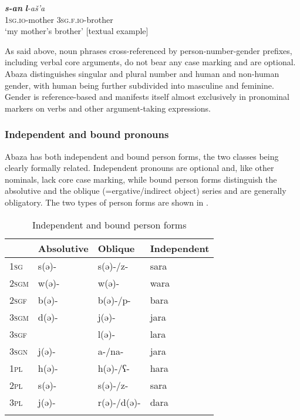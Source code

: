 \documentclass[output=paper]{langscibook}
\begin{document}
\ea 
\label{ex:Arkadiev:6}
    \gll \textbf{\textit{s-an}}  \textbf{\textit{l}}\textit{{}-aš’a}\\
    \textsc{1sg.io}{}-mother  \textsc{3sg.f.io}{}-brother\\
    \glt ‘my mother’s brother’ [textual example]
\z





As said above, noun phrases cross-referenced by person-number-gender prefixes, including verbal core arguments, do not bear any case marking and are optional. Abaza distinguishes singular and plural number and human and non-human gender, with human being further subdivided into masculine and feminine. Gender is reference-based and manifests itself almost exclusively in pronominal markers on verbs and other argument-taking expressions.



\subsubsection{Independent and bound pronouns}\label{sec:Arkadiev:1.2.3}



Abaza has both independent and bound person forms, the two classes being clearly formally related. Independent pronouns are optional and, like other nominals, lack core case marking, while bound person forms distinguish the absolutive and the oblique (=ergative/indirect object) series and are generally obligatory. The two types of person forms are shown in .



\begin{table}
\caption{Independent and bound person forms}
\label{tab:Arkadiev:2}
\begin{tabularx}{0.7\textwidth}{XXXX} 
\lsptoprule
& Absolutive & Oblique & Independent\\
\hline
1\textsc{sg} & {s({ə}){}-} & {s({ə}){}-/z-} & {sara}\\
2\textsc{sgm} & {w({ə})-} & {w({ə})-} & {wara}\\
2\textsc{sgf} & {b({ə})-} & {b({ə})-/p{}-} & {bara}\\
3\textsc{sgm} & {d({ə})-} & {j({ə})-} & {jara}\\
3\textsc{sgf} &  & {l({ə})-} & {lara}\\
3\textsc{sgn} & {j({ə}){}-} & {a{}-/na{}-} & {jara}\\
1\textsc{pl} & {h({ə})-} & {h({ə})-/{ʕ}-} & {hara}\\
2\textsc{pl} & {s({ə})-} & {s({ə})-/z-} & {sara}\\
3\textsc{pl} & {j({ə}){}-} & {r({ə})-/d({ə})-} & {dara}\\
\lspbottomrule
\end{tabularx}
\end{table}
\end{document}
